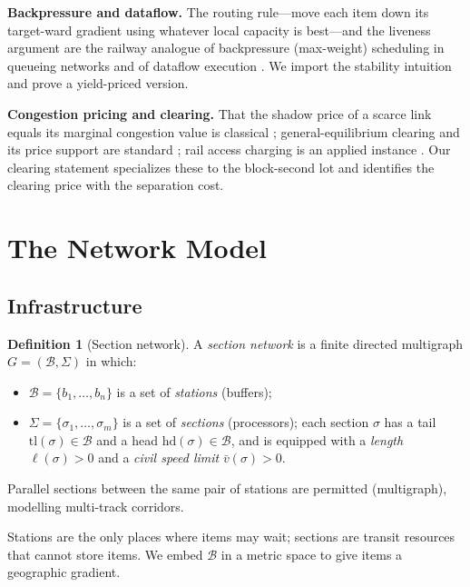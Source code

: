 \documentclass[11pt,twocolumn,a4paper]{article}
\theoremstyle{definition}
\newtheorem{definition}[theorem]{Definition}
\theoremstyle{remark}
\newcommand{\sections}{\Sigma}
\newcommand{\stations}{\mathcal{B}}
\begin{document}
\textbf{Backpressure and dataflow.} The routing rule---move each item down its target-ward gradient using whatever local capacity is best---and the liveness argument are the railway analogue of backpressure (max-weight) scheduling in queueing networks \cite{tassiulas1992,georgiadis2006,neely2010} and of dataflow execution \cite{dennis1980}. We import the stability intuition and prove a yield-priced version.

\textbf{Congestion pricing and clearing.} That the shadow price of a scarce link equals its marginal congestion value is classical \cite{vickrey1969,beckmann1956}; general-equilibrium clearing and its price support are standard \cite{arrow1971}; rail access charging is an applied instance \cite{nash2005,gibson2003}. Our clearing statement specializes these to the block-second lot and identifies the clearing price with the separation cost.

\section{The Network Model}

\subsection{Infrastructure}

\begin{definition}[Section network]
\label{def:network}
A \emph{section network} is a finite directed multigraph $G = (\stations, \sections)$ in which:
\begin{itemize}[nosep]
\item $\stations = \{b_1,\dots,b_n\}$ is a set of \emph{stations} (buffers);
\item $\sections = \{\sigma_1,\dots,\sigma_m\}$ is a set of \emph{sections} (processors); each section $\sigma$ has a tail $\mathrm{tl}(\sigma)\in\stations$ and a head $\mathrm{hd}(\sigma)\in\stations$, and is equipped with a \emph{length} $\ell(\sigma) > 0$ and a \emph{civil speed limit} $\bar v(\sigma) > 0$.
\end{itemize}
Parallel sections between the same pair of stations are permitted (multigraph), modelling multi-track corridors.
\end{definition}

Stations are the only places where items may wait; sections are transit resources that cannot store items. We embed $\stations$ in a metric space to give items a geographic gradient.
\end{document}

